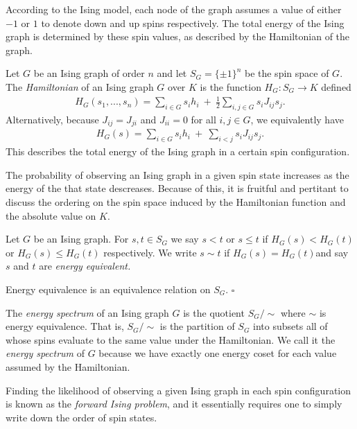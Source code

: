 According to the Ising model, each node of the graph assumes a value of either $-1$ or $1$ to denote down and up spins respectively. The total energy of the Ising graph is determined by these spin values, as described by the Hamiltonian of the graph.
\begin{defn}\label{defn:hamiltonian}
	Let $G$ be an Ising graph of order $n$ and let $S_G = \{\pm 1\}^n$ be the spin space of $G$. The \emph{Hamiltonian} of an Ising graph $G$ over $K$ is the function $H_G:S_G\to K$ defined
	\begin{align*}
		H_G(s_1,...,s_n) = \sum_{i \in G} s_ih_i ~+~ \frac{1}{2}\sum_{i,j \in G} s_i J_{ij}s_j.
	\end{align*}
	Alternatively, because $J_{ij} = J_{ji}$ and $J_{ii} = 0$ for all $i,j \in G$, we equivalently have
	\begin{align*}
		H_G(s) = \sum_{i\in G} s_ih_i ~+~ \sum_{i < j} s_i J_{ij}s_j.
	\end{align*}
	This describes the total energy of the Ising graph in a certain spin configuration.
\end{defn}

The probability of observing an Ising graph in a given spin state increases as the energy of the that state descreases. Because of this, it is fruitful and pertitant to discuss the ordering on the spin space induced by the Hamiltonian function and the absolute value on $K$.
\begin{defn}\label{defn:spin-ordering}
	Let $G$ be an Ising graph. For $s,t\in S_G$ we say $s < t$ or $s \leq t$ if $H_G(s) < H_G(t)$ or $H_G(s) \leq H_G(t)$ respectively. We write $s \sim t$ if $H_G(s) = H_G(t)$and say $s$ and $t$ are \emph{energy equivalent.}
\end{defn}
\begin{lem}\label{lem:energy-equiv}
	Energy equivalence is an equivalence relation on $S_G$. \hfill $\square$
\end{lem}
\begin{defn}\label{defn:energy-cosets}
	The \emph{energy spectrum} of an Ising graph $G$ is the quotient $S_G/\sim$ where $\sim$ is energy equivalence. That is, $S_G/\sim$ is the partition of $S_G$ into subsets all of whose spins evaluate to the same value under the Hamiltonian. We call it the \emph{energy spectrum} of $G$ because we have exactly one energy coset for each value assumed by the Hamiltonian. 
\end{defn}
Finding the likelihood of observing a given Ising graph in each spin configuration is known as the \emph{forward Ising problem}, and it essentially requires one to simply write down the order of spin states.

